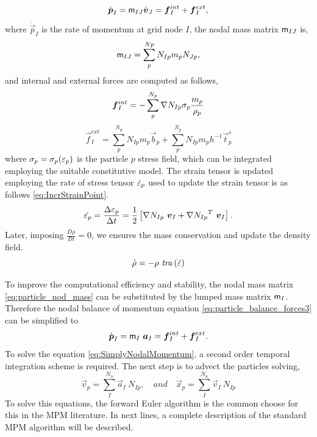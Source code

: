\begin{equation}
  \label{eq:particle_balance_forces3}
  \dot{\vec{p}}_{I}= \tens{m}_{IJ}\dot{\vec{v}}_{J} = \vec{f}_{I}^{int} + \vec{f}_{I}^{ext},
\end{equation}
where $\dot{\vec{p}}_{I}$ is the rate of momentum at grid node $I$, the nodal mass matrix $\mathsf{m}_{IJ}$ is,
\begin{equation}
  \label{eq:particle_nod_mass}
  \mathsf{m}_{IJ} =
  \sum^{Np}_{p} N_{Ip} m_p N_{Jp},
\end{equation}
and internal and external forces are computed as follows,
\begin{equation}
  \label{eq:nodal_internal_forces}
  \vec{f}_{I}^{int} = - \sum^{N_p}_{p} \Grad{N_{Ip}}
  \tens{\sigma}_{p} \frac{m_p}{\rho_p}
\end{equation}
\begin{equation}
  \label{eq:nodal_external_forces}
  \vec{f}_{I}^{ext} = \sum^{N_p}_{p} N_{Ip} m_p \vec{b}_{p} + \sum^{N_p}_{p}
  N_{Ip} m_p h^{-1} \vec{t}^s_{p}
\end{equation}
where $\mathsf{\sigma}_{p} = \mathsf{\sigma}_{p}(\mathsf{\varepsilon}_{p})$
is the particle $p$ stress field, which can be integrated employing
the suitable constitutive model. The strain tensor is updated employing the rate of stress tensor $\dot{ \mathsf{\varepsilon}}_{p}$ used to update the
strain tensor is as follows \eqref{eq:IncrStrainPoint}.
\begin{equation}
  \label{eq:IncrStrainPoint}
  \dot{\tens{\varepsilon}_{p}} = \frac{\Delta
    \tens{\varepsilon}_{p}}{\Delta t} =
  \frac{1}{2}\left[\Grad{N_{Ip}}\ \vec{v}_{I} + \Grad{N_{Ip}}^T\
    \vec{v}_{I}\right].
\end{equation}
Later, imposing $\frac{D \rho}{D t} = 0$, we ensures the mass
conservation and update the density field.
\begin{equation}
  \label{eq:MassConservation}
\dot{\rho} = - \rho\ \mathit{tra} \left( \dot{\mathsf{\varepsilon}} \right)
\end{equation}

To improve the computational efficiency and stability, the nodal mass matrix
\eqref{eq:particle_nod_mass} can be substituted by the lumped mass
matrix $\mathsf{m}_I$. Therefore the nodal balance of momentum equation \eqref{eq:particle_balance_forces3} can be simplified to
\begin{equation}
  \label{eq:SimplyNodalMomentum}
  \dot{\vec{p}}_{I} = \tens{m}_I\ \vec{a}_{I} = \vec{f}_{I}^{int} + \vec{f}_{I}^{ext}.
\end{equation}
To solve the equation \eqref{eq:SimplyNodalMomentum}, a second order
temporal integration scheme is required. The next step is to advect
the particles solving,
\begin{equation}
  \label{eq:Updated_Lagrangian}
  \dot{\vec{v}}_p = \sum^{N_n}_{I}\vec{a}_{I}\ N_{Ip},\quad and\quad \dot{\vec{x}}_{p} = \sum^{N_n}_{I}\vec{v}_{I}\ N_{Ip}  
\end{equation}
To solve this equations, the forward Euler algorithm is the common
choose for this in the MPM literature. In next lines, a complete
description of the standard MPM algorithm will be described.

